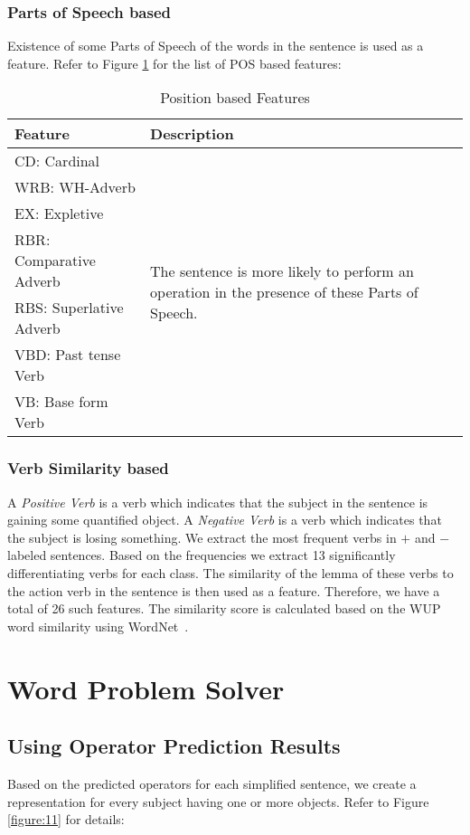 \documentclass[11pt]{article}
\begin{document}
\subsubsection{Parts of Speech based}
Existence of some Parts of Speech of the words in the sentence is used as a feature. Refer to Figure \ref{figure:10} for the list of POS based features:

\begin{table}[H]
\centering
\begin{tabular}{ | m{3cm} | m{4cm} |}
\hline
\textbf{Feature} & \textbf{Description}\\ \hline
CD: Cardinal & \multirow{8}{4cm}{\centering The sentence is more likely to perform an operation in the presence of these Parts of Speech.} \\
\cline{1-1} 
WRB: WH-Adverb & \\
\cline{1-1} 
EX: Expletive & \\ 
\cline{1-1} 
RBR: Comparative Adverb & \\ 
\cline{1-1} 
RBS: Superlative Adverb & \\ 
\cline{1-1} 
VBD: Past tense Verb & \\ 
\cline{1-1} 
VB: Base form Verb & \\ 
\hline
\end{tabular}
\caption{Position based Features}
\label{figure:10}
\end{table}

\subsubsection{Verb Similarity based}
A \textit{Positive Verb} is a verb which indicates that the subject in the sentence is gaining some quantified object. A \textit{Negative Verb} is a verb which indicates that the subject is losing something. We extract the most frequent verbs in  $\mathit{+}$ and $\mathit{-}$ labeled sentences. Based on the frequencies we extract 13 significantly differentiating verbs for each class. The similarity of the lemma of these verbs to the action verb in the sentence is then used as a feature. Therefore, we have a total of 26 such features. The similarity score is calculated based on the WUP word similarity using WordNet~\cite{WordNet:95}.

\section{Word Problem Solver}
\subsection{Using Operator Prediction Results}
Based on the predicted operators for each simplified sentence, we create a representation for every subject having one or more objects. Refer to Figure \ref{figure:11} for details:
\end{document}
